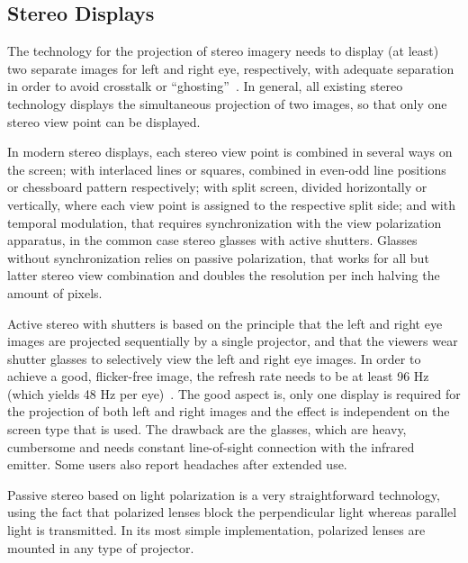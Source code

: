 \subsection{Stereo Displays}
\label{sec.stereo_displays}

The technology for the projection of stereo imagery needs to display (at least) two separate images for left and right eye, respectively, with adequate separation in order to avoid crosstalk or “ghosting”~\cite{Fernando2004}. In general, all existing stereo technology displays the simultaneous projection of two images, so that only one stereo view point can be displayed. 


In modern stereo displays, each stereo view point is combined in several ways on the screen; with interlaced lines or squares, combined in even-odd line positions or chessboard pattern respectively; with split screen, divided horizontally or vertically, where each view point is assigned to the respective split side; and with temporal modulation, that requires synchronization with the view polarization apparatus, in the common case stereo glasses with active shutters. Glasses without synchronization relies on passive polarization, that works for all but latter stereo view combination and doubles the resolution per inch halving the amount of pixels.

Active stereo with shutters is based on the principle that the left and right eye images are projected sequentially by a single projector, and that the viewers wear shutter glasses to selectively view the left and right eye images. In order to achieve a good, flicker-free image, the refresh rate needs to be at least 96 Hz (which yields 48 Hz per eye)~\cite{Fernando2004}. The good aspect is, only one display is required for the projection of both left and right images and the effect is independent on the screen type that is used. The drawback are the glasses, which are heavy, cumbersome and needs constant line-of-sight connection with the infrared emitter. Some users also report headaches after extended use.

Passive stereo based on light polarization is a very straightforward technology, using the fact that polarized lenses block the perpendicular light whereas parallel light is transmitted. In its most simple implementation, polarized lenses are mounted in any type of projector. 

